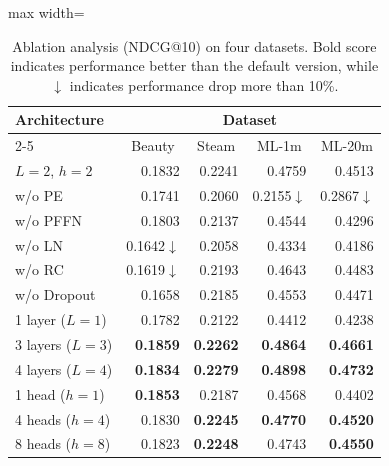 \begin{table}[t]
\renewcommand{\arraystretch}{1}
\setlength{\tabcolsep}{0.75em}
    \centering
    \caption{Ablation analysis (NDCG@10) on four datasets. Bold score indicates performance better than the default version, while $\downarrow$ indicates performance drop more than 10\%.}
    \label{tab:ablation}
    \begin{adjustbox}{max width=\linewidth}
        \begin{tabular}{l r r r r}
        \toprule
     \multirow{2}{*}{Architecture} & \multicolumn{4}{c}{Dataset} \\ 
         \cmidrule(lr){2-5}
          & \multicolumn{1}{c}{Beauty} & \multicolumn{1}{c}{Steam} & \multicolumn{1}{c}{ML-1m} & \multicolumn{1}{c}{ML-20m} \\ \midrule
        $L=2$, $h=2$  & 0.1832 & 0.2241 & 0.4759 & 0.4513 \\ \midrule
        w/o PE  & 0.1741 & 0.2060 & 0.2155$\downarrow$ & 0.2867$\downarrow$ \\
        w/o PFFN  & 0.1803 & 0.2137 & 0.4544 & 0.4296 \\ \midrule
        w/o LN  & 0.1642$\downarrow$ & 0.2058 & 0.4334 & 0.4186 \\
        w/o RC  & 0.1619$\downarrow$ & 0.2193 & 0.4643 & 0.4483 \\
        w/o Dropout  & 0.1658 & 0.2185 & 0.4553 & 0.4471 \\ \midrule
        1 layer \hspace{\fill}($L=1$) & 0.1782 & 0.2122 & 0.4412 & 0.4238 \\
        3 layers \hspace{\fill} ($L=3$) & \textbf{0.1859} & \textbf{0.2262} & \textbf{0.4864} & \textbf{0.4661}\\
        4 layers \hspace{\fill} ($L=4$) & \textbf{0.1834} & \textbf{0.2279} & \textbf{0.4898} & \textbf{0.4732}\\ \midrule
        1 head \hspace{\fill} ($h=1$) & \textbf{0.1853} & 0.2187 & 0.4568 & 0.4402 \\
        4 heads \hspace{\fill} ($h=4$) & 0.1830 & \textbf{0.2245} & \textbf{0.4770} & \textbf{0.4520} \\
        8 heads \hspace{\fill} ($h=8$) & 0.1823 & \textbf{0.2248} & 0.4743 & \textbf{0.4550} \\
        \bottomrule
    \end{tabular}
    \end{adjustbox}
\end{table}







